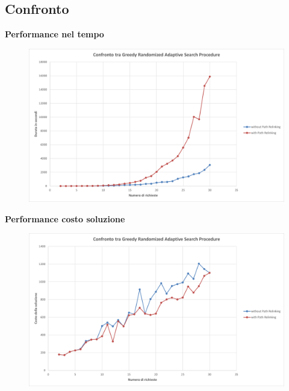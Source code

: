 \documentclass[9pt]{beamer}
\begin{document}
\subsection{Confronto}
\begin{frame}[allowframebreaks]{\subsecname}

	\textbf{Performance nel tempo}
      	\begin{figure}[h]
	\centering
	\includegraphics[width=\textwidth]
	{../charts/17a Confronto tra Greedy Randomized Adaptive Search Procedure}
	\end{figure}

\framebreak

	\textbf{Performance costo soluzione}
      	\begin{figure}[h]
	\centering
	\includegraphics[width=\textwidth]
	{../charts/17b Confronto tra Greedy Randomized Adaptive Search Procedure}
	\end{figure}

\end{frame}
\end{document}
